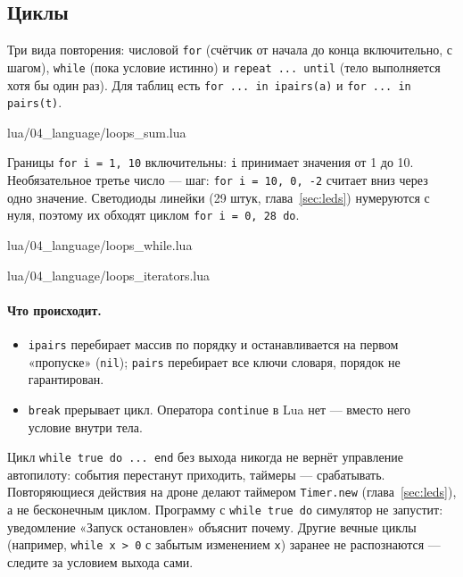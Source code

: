 \subsection{Циклы}

Три вида повторения: числовой \verb|for| (счётчик от начала до конца включительно, с шагом), \verb|while| (пока условие истинно) и \verb|repeat ... until| (тело выполняется хотя бы один раз). Для таблиц есть \verb|for ... in ipairs(a)| и \verb|for ... in pairs(t)|.

\begin{codefile}{lua/04_language/loops_sum.lua}
\end{codefile}

Границы \verb|for i = 1, 10| включительны: \verb|i| принимает значения от 1 до 10. Необязательное третье число --- шаг: \verb|for i = 10, 0, -2| считает вниз через одно значение. Светодиоды линейки (29 штук, глава~\ref{sec:leds}) нумеруются с нуля, поэтому их обходят циклом \verb|for i = 0, 28 do|.

\begin{codefile}{lua/04_language/loops_while.lua}
\end{codefile}

\begin{codefile}{lua/04_language/loops_iterators.lua}
\end{codefile}

\paragraph{Что происходит.}
\begin{itemize}
    \item \verb|ipairs| перебирает массив по порядку и останавливается на первом «пропуске» (\verb|nil|); \verb|pairs| перебирает все ключи словаря, порядок не гарантирован.
    \item \verb|break| прерывает цикл. Оператора \verb|continue| в Lua нет --- вместо него условие внутри тела.
\end{itemize}

\begin{warnbox}
Цикл \verb|while true do ... end| без выхода никогда не вернёт управление автопилоту: события перестанут приходить, таймеры --- срабатывать. Повторяющиеся действия на дроне делают таймером \verb|Timer.new| (глава~\ref{sec:leds}), а не бесконечным циклом. Программу с \verb|while true do| симулятор не запустит: уведомление «Запуск остановлен» объяснит почему. Другие вечные циклы (например, \verb|while x > 0| с забытым изменением \verb|x|) заранее не распознаются --- следите за условием выхода сами.
\end{warnbox}

